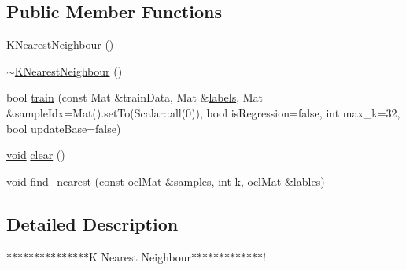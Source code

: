 \subsection*{Public Member Functions}
\begin{DoxyCompactItemize}
\item 
\hyperlink{classcv_1_1ocl_1_1KNearestNeighbour_aecf5ba0c37ebf92994c93c677b7b11fb}{K\-Nearest\-Neighbour} ()
\item 
\hyperlink{classcv_1_1ocl_1_1KNearestNeighbour_a45437f394b684ff3dad52d764f876882}{$\sim$\-K\-Nearest\-Neighbour} ()
\item 
bool \hyperlink{classcv_1_1ocl_1_1KNearestNeighbour_aeb476170f55d73c1643c33924bf07179}{train} (const Mat \&train\-Data, Mat \&\hyperlink{core__c_8h_a1342f74a0f7dd7c20ab7e79b2e6e5af5}{labels}, Mat \&sample\-Idx=Mat().set\-To(Scalar\-::all(0)), bool is\-Regression=false, int max\-\_\-k=32, bool update\-Base=false)
\item 
\hyperlink{legacy_8hpp_a8bb47f092d473522721002c86c13b94e}{void} \hyperlink{classcv_1_1ocl_1_1KNearestNeighbour_a022faf1f863b7b2587f24e68e5157e0f}{clear} ()
\item 
\hyperlink{legacy_8hpp_a8bb47f092d473522721002c86c13b94e}{void} \hyperlink{classcv_1_1ocl_1_1KNearestNeighbour_ac0dc886091ffcb106a7f89c5be34d8af}{find\-\_\-nearest} (const \hyperlink{classcv_1_1ocl_1_1oclMat}{ocl\-Mat} \&\hyperlink{legacy_8hpp_a4fd80ec44eadba9c1fc910f5132046b6}{samples}, int \hyperlink{legacy_8hpp_a7be9b6436e5ea72ff5d5a66779b4bd38}{k}, \hyperlink{classcv_1_1ocl_1_1oclMat}{ocl\-Mat} \&lables)
\end{DoxyCompactItemize}


\subsection{Detailed Description}
$\ast$$\ast$$\ast$$\ast$$\ast$$\ast$$\ast$$\ast$$\ast$$\ast$$\ast$$\ast$$\ast$$\ast$$\ast$\-K Nearest Neighbour$\ast$$\ast$$\ast$$\ast$$\ast$$\ast$$\ast$$\ast$$\ast$$\ast$$\ast$$\ast$$\ast$! 


